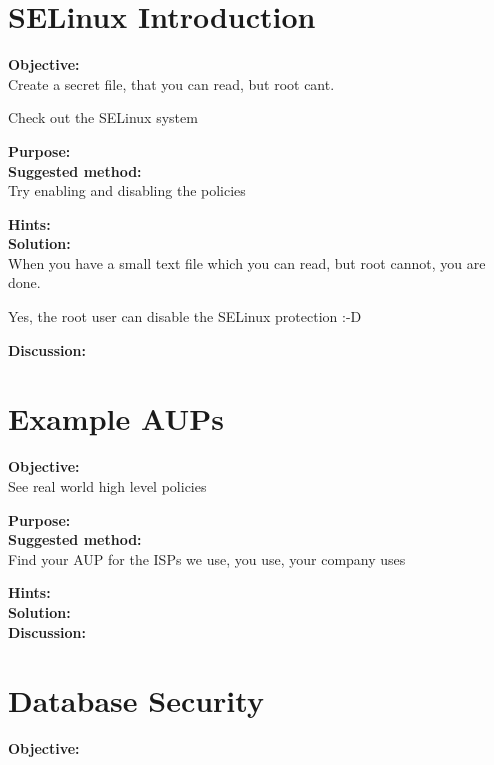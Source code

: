 \documentclass[a4paper,11pt,notitlepage]{report}
\begin{document}
\chapter{SELinux Introduction}
\label{ex:se-linux-intro}

{\bf Objective:}\\
Create a secret file, that you can read, but root cant.

Check out the SELinux system\\

{\bf Purpose:}\\


{\bf Suggested method:}\\
Try enabling and disabling the policies

{\bf Hints:}\\


{\bf Solution:}\\
When you have a small text file which you can read, but root cannot, you are done.

Yes, the root user can disable the SELinux protection :-D

{\bf Discussion:}\\


\chapter{Example AUPs}
\label{ex:example-AUP}

{\bf Objective:}\\
See real world high level policies

{\bf Purpose:}\\


{\bf Suggested method:}\\
Find your AUP for the ISPs we use, you use, your company uses

{\bf Hints:}\\


{\bf Solution:}\\


{\bf Discussion:}\\

\chapter{Database Security}
\label{ex:database-security}

{\bf Objective:}\\
\end{document}
